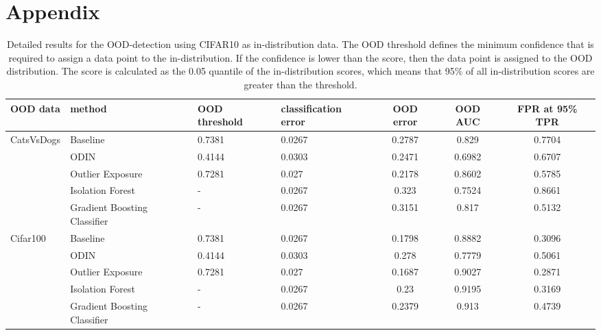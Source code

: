 \documentclass{article}
\begin{document}
\newpage
\section{Appendix}
\setcounter{table}{0}
\renewcommand{\thetable}{A\arabic{table}}

\begin{table}[h]
    \centering
    \caption{Detailed results for the OOD-detection using CIFAR10 as in-distribution data. The OOD threshold defines the minimum confidence that is required to assign a data point to the in-distribution. If the confidence is lower than the score, then the data point is assigned to the OOD distribution. The score is calculated as the 0.05 quantile of the in-distribution scores, which means that 95\% of all in-distribution scores are greater than the threshold.}
\begin{tabular}{lllHccc}
\toprule
            OOD data & method                              & OOD threshold & classification error & OOD error & OOD AUC & FPR at 95\% TPR \\
\toprule
CatsVsDogs & Baseline &        0.7381 &               0.0267 &    0.2787 &   0.829 &         0.7704 \\
            & ODIN &        0.4144 &               0.0303 &    0.2471 &  0.6982 &         0.6707 \\
            & Outlier Exposure &        0.7281 &                0.027 &    0.2178 &  0.8602 &         0.5785 \\
            & Isolation Forest &             - &               0.0267 &     0.323 &  0.7524 &         0.8661 \\
            & Gradient Boosting Classifier &             - &               0.0267 &    0.3151 &   0.817 &         0.5132 \\
\midrule
Cifar100 & Baseline &        0.7381 &               0.0267 &    0.1798 &  0.8882 &         0.3096 \\
            & ODIN &        0.4144 &               0.0303 &     0.278 &  0.7779 &         0.5061 \\
            & Outlier Exposure &        0.7281 &                0.027 &    0.1687 &  0.9027 &         0.2871 \\
            & Isolation Forest &             - &               0.0267 &      0.23 &  0.9195 &         0.3169 \\
            & Gradient Boosting Classifier &             - &               0.0267 &    0.2379 &   0.913 &         0.4739 \\

\end{tabular}
\end{table}
\end{document}
